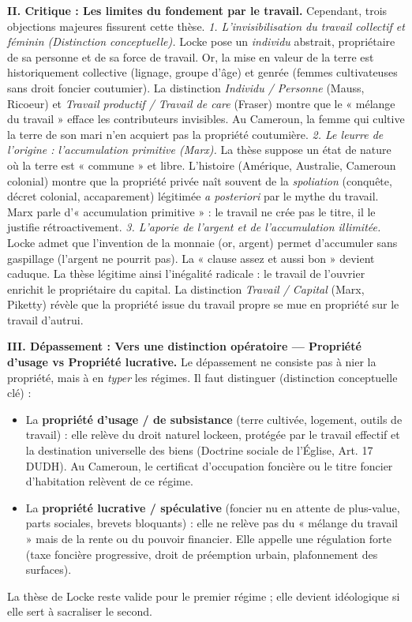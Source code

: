 \documentclass[11pt]{article}
\begin{document}
\begin{exoresolu}
\textbf{II. Critique : Les limites du fondement par le travail.}
Cependant, trois objections majeures fissurent cette thèse.
\textit{1. L'invisibilisation du travail collectif et féminin (Distinction conceptuelle).} Locke pose un \emph{individu} abstrait, propriétaire de sa personne et de sa force de travail. Or, la mise en valeur de la terre est historiquement collective (lignage, groupe d'âge) et genrée (femmes cultivateuses sans droit foncier coutumier). La distinction \emph{Individu / Personne} (Mauss, Ricoeur) et \emph{Travail productif / Travail de care} (Fraser) montre que le « mélange du travail » efface les contributeurs invisibles. Au Cameroun, la femme qui cultive la terre de son mari n'en acquiert pas la propriété coutumière.
\textit{2. Le leurre de l'origine : l'accumulation primitive (Marx).} La thèse suppose un état de nature où la terre est « commune » et libre. L'histoire (Amérique, Australie, Cameroun colonial) montre que la propriété privée naît souvent de la \emph{spoliation} (conquête, décret colonial, accaparement) légitimée \emph{a posteriori} par le mythe du travail. Marx parle d'« accumulation primitive » : le travail ne crée pas le titre, il le justifie rétroactivement.
\textit{3. L'aporie de l'argent et de l'accumulation illimitée.} Locke admet que l'invention de la monnaie (or, argent) permet d'accumuler sans gaspillage (l'argent ne pourrit pas). La « clause assez et aussi bon » devient caduque. La thèse légitime ainsi l'inégalité radicale : le travail de l'ouvrier enrichit le propriétaire du capital. La distinction \emph{Travail / Capital} (Marx, Piketty) révèle que la propriété issue du travail propre se mue en propriété sur le travail d'autrui.

\textbf{III. Dépassement : Vers une distinction opératoire — Propriété d'usage vs Propriété lucrative.}
Le dépassement ne consiste pas à nier la propriété, mais à en \emph{typer} les régimes. Il faut distinguer (distinction conceptuelle clé) :
\begin{itemize}
    \item La \textbf{propriété d'usage / de subsistance} (terre cultivée, logement, outils de travail) : elle relève du droit naturel lockeen, protégée par le travail effectif et la destination universelle des biens (Doctrine sociale de l'Église, Art. 17 DUDH). Au Cameroun, le certificat d'occupation foncière ou le titre foncier d'habitation relèvent de ce régime.
    \item La \textbf{propriété lucrative / spéculative} (foncier nu en attente de plus-value, parts sociales, brevets bloquants) : elle ne relève pas du « mélange du travail » mais de la rente ou du pouvoir financier. Elle appelle une régulation forte (taxe foncière progressive, droit de préemption urbain, plafonnement des surfaces).
\end{itemize}
La thèse de Locke reste valide pour le premier régime ; elle devient idéologique si elle sert à sacraliser le second.


\end{exoresolu}
\end{document}
